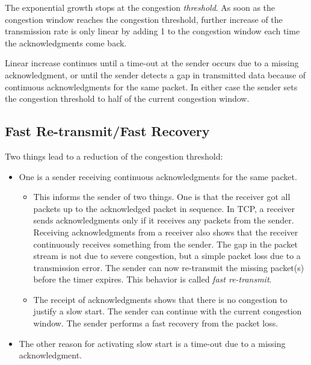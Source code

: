 The exponential growth stops at the congestion \textit{threshold}. As soon as the congestion window reaches the congestion threshold, further increase of the transmission rate is only linear by adding 1 to the congestion window each time the acknowledgments come back.

Linear increase continues until a time-out at the sender occurs due to a missing acknowledgment, or until the sender detects a gap in transmitted data because of continuous acknowledgments for the same packet. In either case the sender sets the congestion threshold to half of the current congestion window.



\subsection{Fast Re-transmit/Fast Recovery}
Two things lead to a reduction of the congestion threshold:

\begin{itemize}
	\item One is a sender receiving continuous acknowledgments for the same packet. 
	\begin{itemize}
		\item This informs the sender of two things. One is that the receiver got all packets up to the acknowledged packet in sequence. In TCP, a receiver sends acknowledgments only if it receives any packets from the sender. Receiving acknowledgments from a
		receiver also shows that the receiver continuously receives something from the sender. The gap in the packet stream is not due to severe congestion, but a
		simple packet loss due to a transmission error. The sender can now re-transmit the missing packet(s) before the timer expires. This behavior is called \textit{fast re-transmit}.
		
		\item The receipt of acknowledgments shows that there is no congestion to justify a slow start. The sender can continue with the current congestion window. The sender performs a fast recovery from the packet loss.
	\end{itemize}
	

	\item The other reason for activating slow start is a time-out due to a missing acknowledgment.
\end{itemize} 



